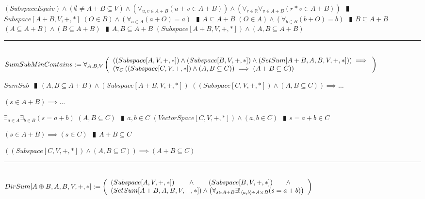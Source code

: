 \documentclass{book}
\newcommand{\abr}{:=}
\newcommand{\pipe}{$\phantom{(}\vrectangleblack\phantom{)}$}
\newcommand{\pr}[1]{\left(#1\right)}
\begin{document}
\begin{shaded}
\begin{enumerate}
    \lit $(SubspaceEquiv) \land (\emptyset \neq A + B \subseteq V) \land \pr{\forall_{u, v \in A + B}(u + v \in A + B)} \land \pr{\forall_{r \in \mathbb{R}} \forall_{v \in A + B}(r * v \in A + B)}$ \pipe $Subspace[A + B, V, + ,*]$
    \lit $(O \in B) \land \pr{\forall_{a \in A}(a + O) = a}$ \pipe $A \subseteq A + B$
    \lit $(O \in A) \land \pr{\forall_{b \in B}(b + O) = b}$ \pipe $B \subseteq A + B$
    \lit $(A \subseteq A + B) \land (B \subseteq A + B)$ \pipe $A, B \subseteq A + B$
    \lit $(Subspace[A + B, V, + ,*]) \land (A, B \subseteq A + B)$
  \end{enumerate} \vspace{.75mm} \hrule \vspace{.75mm} \ \\

  $SumSubMinContains \abr \forall_{A, B, V}\left(\begin{array}{ll}
    \pr{(Subspace[A, V, +, *]) \land (Subspace[B, V, +, *]) \land (SetSum[A + B, A, B, V, +, *])} \hfill \implies \hfill \\
    \pr{\forall_{C}\pr{(Subspace[C, V, + ,*]) \land (A, B \subseteq C)} \implies (A + B \subseteq C)}
  \end{array}\right)$
  \begin{enumerate}
    \lit $SumSub$ \pipe $(A, B \subseteq A + B) \land (Subspace[A + B, V, + ,*])$
    \lit $\pr{(Subspace[C, V, + ,*]) \land (A, B \subseteq C)} \implies \ldots$
    \begin{enumerate}
      \lit $(s \in A + B) \implies \ldots$
      \begin{enumerate}
        \lit $\exists_{a \in A} \exists_{b \in B}(s = a + b)$
        \lit $(A, B \subseteq C)$ \pipe $a, b \in C$
        \lit $(VectorSpace[C, V, + ,*]) \land (a, b \in C)$ \pipe $s = a + b \in C$
      \end{enumerate}
      \lit $(s \in A + B) \implies (s \in C)$ \pipe $A + B \subseteq C$
    \end{enumerate}
    \lit $\pr{(Subspace[C, V, + ,*]) \land (A, B \subseteq C)} \implies (A + B \subseteq C)$
  \end{enumerate} \vspace{.75mm} \hrule \vspace{.75mm} \ \\ 

  $DirSum[A \oplus B, A, B, V, +, *] \abr \left(\begin{array}{ll}
    (Subspace[A, V, +, *]) \hfill \land \hfill (Subspace[B, V, +, *]) \hfill \land \hfill \\
    (SetSum[A + B, A, B, V, +, *]) \hfill \land \hfill \pr{\forall_{s \in A + B} \exists!_{\langle a, b \rangle \in A \times B}(s = a + b)}
  \end{array}\right)$ \\


\end{shaded}
\end{document}
